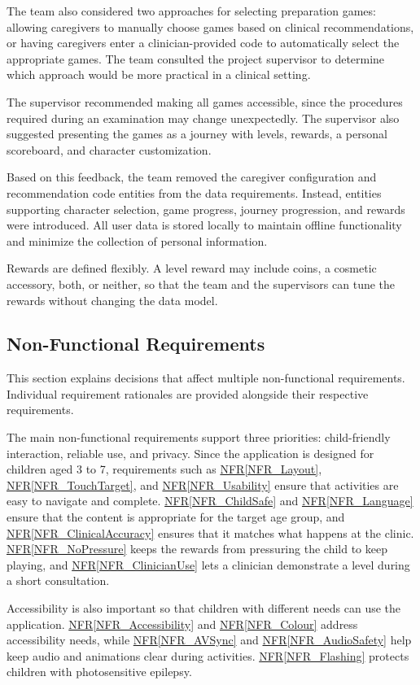 \documentclass[10pt]{article}
\newcommand{\nfrref}[1]{\hyperref[#1]{NFR\ref*{#1}}}
\begin{document}
The team also considered two approaches for selecting preparation
games: allowing caregivers to manually choose games based
on clinical recommendations, or having caregivers enter a
clinician-provided code to automatically select the appropriate
games. The team consulted the project supervisor to determine
which approach would be more practical in a clinical setting.

The supervisor recommended making all games accessible,
since the procedures required during an examination may
change unexpectedly. The supervisor also suggested presenting the
games as a journey with levels, rewards, a personal
scoreboard, and character customization.

Based on this feedback, the team removed the caregiver configuration
and recommendation code entities from the data requirements.
Instead, entities supporting character selection, 
game progress, journey progression, and rewards
were introduced. All user data is stored locally to maintain
offline functionality and minimize the collection of
personal information.

Rewards are defined flexibly. A level reward may include coins, a
cosmetic accessory, both, or neither, so that the team and the
supervisors can tune the rewards without changing the data model.

\subsection{Non-Functional Requirements}

This section explains decisions that affect multiple non-functional requirements. Individual
requirement rationales are provided alongside their respective requirements.

The main non-functional requirements support three priorities: child-friendly
interaction, reliable use, and privacy. Since the application is designed for
children aged 3 to 7, requirements such as \nfrref{NFR_Layout},
\nfrref{NFR_TouchTarget}, and \nfrref{NFR_Usability} ensure that activities are
easy to navigate and complete. \nfrref{NFR_ChildSafe} and
\nfrref{NFR_Language} ensure that the content is appropriate for the target
age group, and \nfrref{NFR_ClinicalAccuracy} ensures that it matches what
happens at the clinic. \nfrref{NFR_NoPressure} keeps the rewards from
pressuring the child to keep playing, and \nfrref{NFR_ClinicianUse} lets a
clinician demonstrate a level during a short consultation.

Accessibility is also important so that children with different needs can
use the application. \nfrref{NFR_Accessibility} and \nfrref{NFR_Colour}
address accessibility needs, while \nfrref{NFR_AVSync} and
\nfrref{NFR_AudioSafety} help keep audio and animations clear during
activities. \nfrref{NFR_Flashing} protects children with photosensitive
epilepsy.
\end{document}
